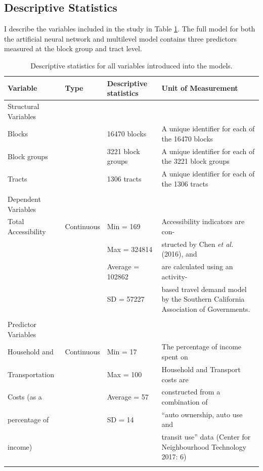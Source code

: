 \documentclass[a4paper,UKenglish]{lipics-v2018}
\begin{document}
\subsection{Descriptive Statistics}
I describe the variables included in the study in Table \ref{tab:table2}. The full model for both the artificial neural network and multilevel model contains three predictors measured at the block group and tract level.

\begin{center}
\singlespacing
\begin{table}
\caption[Table 2] {\label{tab:table2} Descriptive statistics for all variables introduced into the models.} 
 \begin{tabular}{p{3cm}p{1.6cm}p{2.5cm}p{5cm}}
 \toprule
 Variable & Type & Descriptive statistics & Unit of Measurement \\ [0.5ex] 
 \hline Structural Variables & & & \\
 [0.5ex] 
 \hline
 Blocks &  & 16470 blocks & A unique identifier for each of the 16470 blocks \\ 
 Block groups &  & 3221 block groups & A unique identifier for each of the 3221 block groups \\
 Tracts &  & 1306 tracts & A unique identifier for each of the 1306 tracts \\ \\
 \hline
 Dependent Variables &  &  &  \\
 \hline
 Total Accessibility & Continuous & Min = 169 & Accessibility indicators are con- \\ 
 & & Max = 324814 &  structed by Chen \textit{et al.} (2016), and \\
 & & Average = 102862 & are calculated using an activity- \\
 & & SD = 57227 & based travel demand model by the Southern California Association of Governments. \\
 & & &  \\ \hline
 Predictor Variables &  &  &  \\
 \hline
 Household and & Continuous & Min = 17 &  The percentage of income spent on \\ 
 Transportation && Max = 100 &
 Household and Transport costs are \\
 Costs (as a && Average = 57 & constructed from a combination of \\ 
 percentage of & & SD = 14 & “auto ownership, auto use and \\
 income) & & & transit use” data (Center for Neighbourhood Technology 2017: 6) \\ \\ \hline

\end{tabular}
\end{table}
\end{center}
\end{document}
